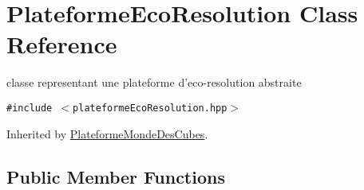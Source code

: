 \hypertarget{classPlateformeEcoResolution}{
\section{PlateformeEcoResolution Class Reference}
\label{classPlateformeEcoResolution}
}
classe representant une plateforme d'eco-resolution abstraite  


{\tt \#include $<$plateformeEcoResolution.hpp$>$}

Inherited by \hyperlink{classPlateformeMondeDesCubes}{PlateformeMondeDesCubes}.

\subsection*{Public Member Functions}
